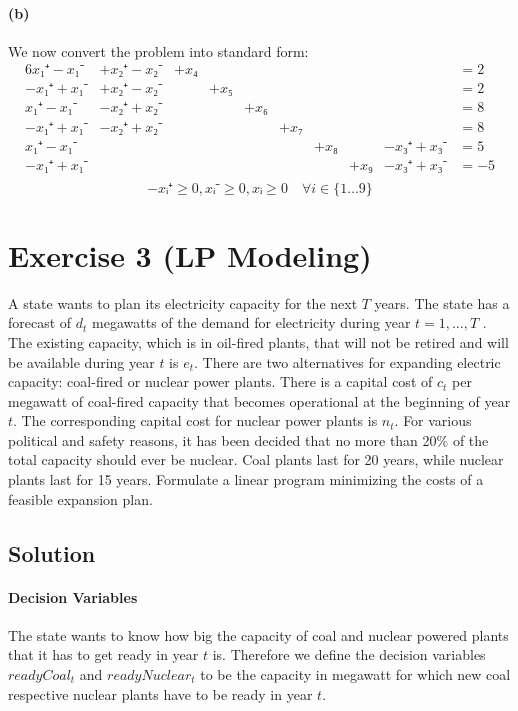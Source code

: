 \documentclass[a4paper, 12pt]{report}
\begin{document}
\paragraph{(b)}
We now convert the problem into standard form:
\begin{alignat*}{6}
     x₁⁺- x₁⁻ & +x₂⁺- x₂⁻ &+x₄&   &   &   &   &     &             &=  2\\
    -x₁⁺+ x₁⁻ & +x₂⁺- x₂⁻ &   &+x₅&   &   &   &     &             &=  2\\
     x₁⁺- x₁⁻ & -x₂⁺+ x₂⁻ &   &   &+x₆&   &   &     &             &=  8\\
    -x₁⁺+ x₁⁻ & -x₂⁺+ x₂⁻ &   &   &   &+x₇&   &     &             &=  8\\
     x₁⁺- x₁⁻ &           &   &   &   &   &+x₈&     & - x₃⁺ + x₃⁻ &=  5\\
    -x₁⁺+ x₁⁻ &           &   &   &   &   &   & +x₉ & - x₃⁺ + x₃⁻ &= -5\\
\end{alignat*}
\[
    -xᵢ⁺ ≥ 0, xᵢ⁻ ≥ 0,xᵢ ≥ 0 \quad ∀ i ∈ \{1…9\}
\]

\section{Exercise 3 (LP Modeling)}

A state wants to plan its electricity capacity for the next $T$ years. The
state has a forecast of $d_t$ megawatts of the demand for electricity during
year $t = 1, …, T$ . The existing capacity, which is in oil-fired plants, that
will not be retired and will be available during year $t$ is $e_t$. There are
two alternatives for expanding electric capacity: coal-fired or nuclear power
plants. There is a capital cost of $c_t$ per megawatt of coal-fired capacity
that becomes operational at the beginning of year $t$. The corresponding
capital cost for nuclear power plants is $n_t$. For various political and
safety reasons, it has been decided that no more than 20\% of the total
capacity should ever be nuclear. Coal plants last for 20 years, while nuclear
plants last for 15 years. Formulate a linear program minimizing the costs of a
feasible expansion plan.

\subsection{Solution}

\paragraph{Decision Variables} The state wants to know how big the capacity of
coal and nuclear powered plants that it has to get ready in year $t$ is.
Therefore we define the decision variables $readyCoal_t$ and $readyNuclear_t$ to
be the capacity in megawatt for which new coal respective nuclear plants have to
be ready in year $t$.
\end{document}
